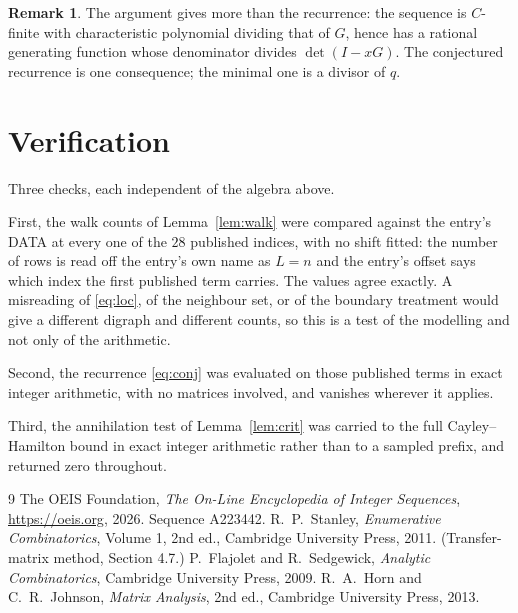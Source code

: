 \documentclass[11pt,a4paper]{article}
\theoremstyle{plain}
\theoremstyle{definition}
\newtheorem{remark}[theorem]{Remark}
\begin{document}
\begin{remark}
The argument gives more than the recurrence: the sequence is $C$-finite with characteristic
polynomial dividing that of $G$, hence has a rational generating function whose denominator
divides $\det(I-xG)$. The conjectured recurrence is one consequence; the minimal one is a
divisor of $q$.
\end{remark}

\section{Verification}

Three checks, each independent of the algebra above.

First, the walk counts of Lemma~\ref{lem:walk} were compared against the entry's DATA at
every one of the $28$ published indices, with no shift fitted: the number of rows is
read off the entry's own name as $L=n$ and the entry's offset says which index the first
published term carries. The values agree exactly. A misreading of \eqref{eq:loc}, of the
neighbour set, or of the boundary treatment would give a different digraph and different
counts, so this is a test of the modelling and not only of the arithmetic.

Second, the recurrence \eqref{eq:conj} was evaluated on those published terms in exact
integer arithmetic, with no matrices involved, and vanishes wherever it applies.

Third, the annihilation test of Lemma~\ref{lem:crit} was carried to the full
Cayley--Hamilton bound in exact integer arithmetic rather than to a sampled prefix, and
returned zero throughout.

\begin{thebibliography}{9}
 The OEIS Foundation, \emph{The On-Line Encyclopedia of Integer
Sequences}, \url{https://oeis.org}, 2026. Sequence A223442.
 R.~P.~Stanley, \emph{Enumerative Combinatorics}, Volume 1, 2nd ed.,
Cambridge University Press, 2011. (Transfer-matrix method, Section 4.7.)
 P.~Flajolet and R.~Sedgewick, \emph{Analytic Combinatorics}, Cambridge
University Press, 2009.
 R.~A.~Horn and C.~R.~Johnson, \emph{Matrix Analysis}, 2nd ed., Cambridge
University Press, 2013.
\end{thebibliography}
\end{document}
